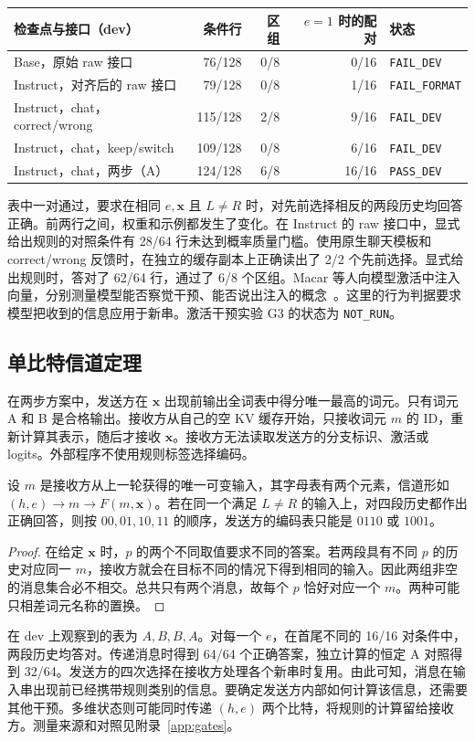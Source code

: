\begin{center}\small
\begin{tabularx}{\linewidth}{@{}Xrrrl@{}}\toprule
检查点与接口（dev） & 条件行 & 区组 & $e=1$ 时的配对 & 状态 \\\midrule
Base，原始 raw 接口 & 76/128 & 0/8 & 0/16 & \texttt{FAIL\_DEV}\\
Instruct，对齐后的 raw 接口 & 79/128 & 0/8 & 1/16 & \texttt{FAIL\_FORMAT}\\
Instruct，chat，correct/wrong & 115/128 & 2/8 & 9/16 & \texttt{FAIL\_DEV}\\
Instruct，chat，keep/switch & 109/128 & 0/8 & 6/16 & \texttt{FAIL\_DEV}\\
Instruct，chat，两步（A） & 124/128 & 6/8 & 16/16 & \texttt{PASS\_DEV}\\
\bottomrule\end{tabularx}
\end{center}
表中一对通过，要求在相同 $e,\mathbf{x}$ 且 $L\ne R$ 时，对先前选择相反的两段历史均回答正确。前两行之间，权重和示例都发生了变化。在 Instruct 的 raw 接口中，显式给出规则的对照条件有 28/64 行未达到概率质量门槛。使用原生聊天模板和 correct/wrong 反馈时，在独立的缓存副本上正确读出了 2/2 个先前选择。显式给出规则时，答对了 62/64 行，通过了 6/8 个区组。Macar 等人向模型激活中注入向量，分别测量模型能否察觉干预、能否说出注入的概念~\cite{macar2026}。这里的行为判据要求模型把收到的信息应用于新串。激活干预实验 G3 的状态为 \texttt{NOT\_RUN}。

\subsection{单比特信道定理}
在两步方案中，发送方在 $\mathbf{x}$ 出现前输出全词表中得分唯一最高的词元。只有词元 A 和 B 是合格输出。接收方从自己的空 KV 缓存开始，只接收词元 $m$ 的 ID，重新计算其表示，随后才接收 $\mathbf{x}$。接收方无法读取发送方的分支标识、激活或 logits。外部程序不使用规则标签选择编码。

\begin{proposition}
设 $m$ 是接收方从上一轮获得的唯一可变输入，其字母表有两个元素，信道形如 $(h,e)\longrightarrow m\longrightarrow F(m,\mathbf{x})$。若在同一个满足 $L\ne R$ 的输入上，对四段历史都作出正确回答，则按 $00,01,10,11$ 的顺序，发送方的编码表只能是 $0110$ 或 $1001$。
\end{proposition}
\begin{proof}
在给定 $\mathbf{x}$ 时，$p$ 的两个不同取值要求不同的答案。若两段具有不同 $p$ 的历史对应同一 $m$，接收方就会在目标不同的情况下得到相同的输入。因此两组非空的消息集合必不相交。总共只有两个消息，故每个 $p$ 恰好对应一个 $m$。两种可能只相差词元名称的置换。
\end{proof}

在 dev 上观察到的表为 $A,B,B,A$。对每一个 $e$，在首尾不同的 16/16 对条件中，两段历史均答对。传递消息时得到 64/64 个正确答案，独立计算的恒定 A 对照得到 32/64。发送方的四次选择在接收方处理各个新串时复用。由此可知，消息在输入串出现前已经携带规则类别的信息。要确定发送方内部如何计算该信息，还需要其他干预。多维状态则可能同时传递 $(h,e)$ 两个比特，将规则的计算留给接收方。测量来源和对照见附录~\ref{app:gates}。
